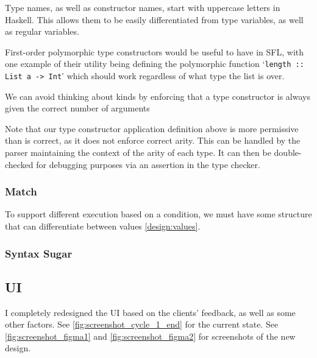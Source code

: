Type names, as well as constructor names, start with uppercase letters in Haskell. This allows them to be easily differentiated from type variables, as well as regular variables. 

First-order polymorphic type constructors would be useful to have in \ac{SFL}, with one example of their utility being defining the polymorphic function `\verb|length :: List a -> Int|' which should work regardless of what type the list is over.



We can avoid thinking about kinds by enforcing that a type constructor is always given the correct number of arguments

Note that our type constructor application definition above is more permissive than is correct, as it does not enforce correct arity. This can be handled by the parser maintaining the context of the arity of each type. It can then be double-checked for debugging purposes via an assertion in the type checker. 

\subsubsection{Match}
To support different execution based on a condition, we must have some structure that can differentiate between values \ref{design:values}. 

\subsubsection{Syntax Sugar}

\subsection{UI}
I completely redesigned the UI based on the clients' feedback, as well as some other factors. See \ref{fig:screenshot_cycle_1_end} for the current state. See \ref{fig:screenshot_figma1} and \ref{fig:screenshot_figma2} for screenshots of the new design. 

